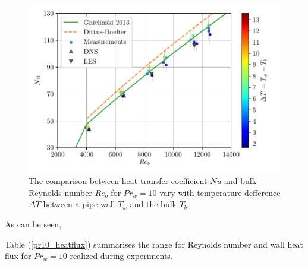 \documentclass[12pt,oneside]{jbook}
\begin{document}
\begin{figure}[ht]
	\vspace{0zh}
	\begin{center}
		\includegraphics[width=1\linewidth]{fig/pr10heatflux_renudt.pdf}
		\vspace{-3zh}
		\caption{The comparison between heat transfer coefficient $Nu$ and bulk Reynolds number $Re_{b}$ for $Pr_{w} = 10$ vary with temperature defference $\Delta T$ between a pipe wall $T_{w}$ and the bulk $T_{b}$.}
		\label{pr10_renu_heatflux}
	\end{center}
	\vspace{0zh}
\end{figure}

As can be seen,

Table (\ref{pr10_heatflux}) summarises the range for Reynolds number and wall heat flux for $Pr_{w}=10$ realized during experiments.
\end{document}
